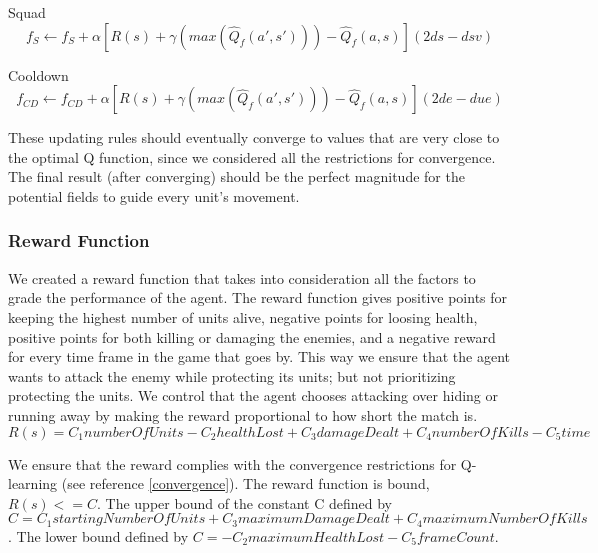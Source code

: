 \begin{flushleft}
Squad 
\begin{equation}
f_{S}  \leftarrow f_{S}  + \alpha [ R(s) + \gamma (max(\hat{Q}_{f} (a',s')))-\hat{Q}_{f} (a,s) ] (2ds - dsv)
\end{equation}
\end{flushleft} 

\begin{flushleft}
Cooldown
\begin{equation}
f_{CD}  \leftarrow f_{CD}  + \alpha [ R(s) + \gamma (max(\hat{Q}_{f} (a',s')))-\hat{Q}_{f} (a,s) ](2de - due)
\end{equation}
\end{flushleft} 


These updating rules should eventually converge to values that are very close to the optimal Q function, since we considered all the restrictions for convergence. The final result (after converging) should be the perfect magnitude for the potential fields to guide every unit's movement.

\subsubsection{Reward Function} \label{reward}

We created a reward function that takes into consideration all the factors to grade the performance of the agent. The reward function gives positive points for keeping the highest number of units alive, negative points for loosing health, positive points for both killing or damaging the enemies, and a negative reward for every time frame in the game that goes by. This way we ensure that the agent wants to attack the enemy while protecting its units; but not prioritizing protecting the units. We control that the agent chooses attacking over hiding or running away by making the reward proportional to how short the match is.
\begin{equation}
R(s) = C_1 numberOfUnits  -  C_2 healthLost  +   C_3 damageDealt  +   C_4 numberOfKills -  C_5 time
\end{equation}

We ensure that the reward complies with the convergence restrictions for Q-learning  (see reference \ref{convergence}). The reward function is bound, $R(s) <= C$. The upper bound of the constant C defined by $C = C_1 startingNumberOfUnits  +   C_3 maximumDamageDealt  +   C_4 maximumNumberOfKills$. The lower bound defined by $C = -  C_2 maximumHealthLost -  C_5 frameCount$. 

